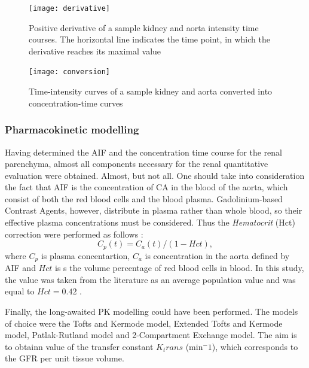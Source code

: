 \begin{figure}[H]
	\centering
	\texttt{[image: derivative]}
\caption[Positive derivative of the sample kidney and aorta intensity time courses]{Positive derivative of a sample kidney and aorta intensity time courses. The horizontal line indicates the time point, in which the derivative reaches its maximal value}
\label{fig:derivative}
\end{figure}

\begin{figure}[H]
	\centering
	\texttt{[image: conversion]}
\caption[Time courses of a sample kidney and aorta after intensity-concentration conversion]{Time-intensity curves of a sample kidney and aorta converted into concentration-time curves}
\label{fig:conversion}
\end{figure}


\subsubsection{Pharmacokinetic modelling}

Having determined the AIF and the concentration time course for the renal parenchyma, almost all components necessary for the renal  quantitative evaluation were obtained. Almost, but not all. One should take into consideration the fact that AIF is the concentration of CA in the blood of the aorta, which consist of both the red blood cells and the blood plasma. Gadolinium-based Contrast Agents, however, distribute in plasma rather than whole blood, so their effective plasma concentrations must be considered. Thus the \textit{Hematocrit} (Hct) correction were performed as follows \cite{tofts2010t1}:
\begin{equation}
	\label{eq:hematocrit}
	C_{p}(t) = C_{a}(t) / (1-Hct),
\end{equation}
where $C_p$ is plasma concentartion, $C_a$ is concentration in the aorta defined by AIF and $Hct$ is s the volume percentage of red blood cells in blood. In this study, the value was taken from the literature as an average population value and was equal to $Hct=0.42$ \cite{tofts2010t1}.

Finally, the long-awaited PK modelling could have been performed. The models of choice were the Tofts and Kermode model, Extended Tofts and Kermode model, Patlak-Rutland model and 2-Compartment Exchange model. The aim is to obtainn value of the transfer constant $K_trans$ (min$^-1$), which corresponds to the GFR per unit tissue volume.
 
